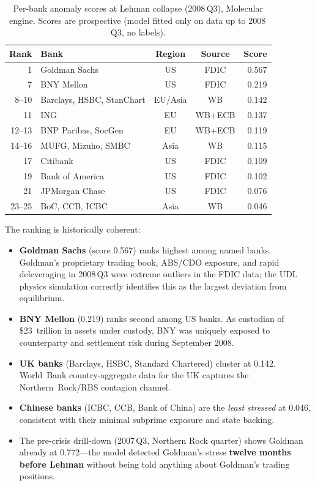 \begin{table}[ht]
\centering
\caption{Per-bank anomaly scores at Lehman collapse (2008\,Q3),
Molecular engine.  Scores are prospective (model fitted only on
data up to 2008\,Q3, no labels).}
\label{tab:drilldown_lehman}
\begin{tabular}{rlccr}
\hline
Rank & Bank                   & Region & Source & Score \\
\hline
1    & Goldman Sachs          & US     & FDIC   & 0.567 \\
7    & BNY Mellon             & US     & FDIC   & 0.219 \\
8--10 & Barclays, HSBC, StanChart & EU/Asia & WB & 0.142 \\
11   & ING                    & EU     & WB+ECB & 0.137 \\
12--13 & BNP Paribas, SocGen  & EU     & WB+ECB & 0.119 \\
14--16 & MUFG, Mizuho, SMBC   & Asia   & WB     & 0.115 \\
17   & Citibank               & US     & FDIC   & 0.109 \\
19   & Bank of America        & US     & FDIC   & 0.102 \\
21   & JPMorgan Chase         & US     & FDIC   & 0.076 \\
23--25 & BoC, CCB, ICBC       & Asia   & WB     & 0.046 \\
\hline
\end{tabular}
\end{table}

The ranking is historically coherent:

\begin{itemize}
\item \textbf{Goldman Sachs} (score 0.567) ranks highest among named
  banks.  Goldman's proprietary trading book, ABS/CDO exposure, and
  rapid deleveraging in 2008\,Q3 were extreme outliers in the FDIC
  data; the UDL physics simulation correctly identifies this as the
  largest deviation from equilibrium.

\item \textbf{BNY Mellon} (0.219) ranks second among US banks.  As
  custodian of \$23~trillion in assets under custody, BNY was
  uniquely exposed to counterparty and settlement risk during
  September 2008.

\item \textbf{UK banks} (Barclays, HSBC, Standard Chartered) cluster
  at 0.142.  World~Bank country-aggregate data for the UK captures
  the Northern~Rock/RBS contagion channel.

\item \textbf{Chinese banks} (ICBC, CCB, Bank of China) are the
  \emph{least stressed} at 0.046, consistent with their minimal
  subprime exposure and state backing.

\item The pre-crisis drill-down (2007\,Q3, Northern Rock quarter)
  shows Goldman already at 0.772---the model detected Goldman's
  stress \textbf{twelve months before Lehman} without being told
  anything about Goldman's trading positions.
\end{itemize}

